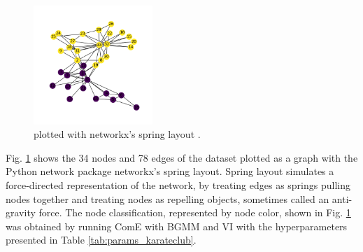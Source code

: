 \documentclass[conference]{IEEEtran}
\begin{document}
\begin{figure}[htbp]
    \centering
    \includegraphics[width=0.4\textwidth]{images/karateclub/spring.png}
    \caption{ plotted with networkx's spring layout \cite{KarateClubDS, networkx}.}
    \label{fig:karateclub_spring}
\end{figure}

Fig. \ref{fig:karateclub_spring} shows the 34 nodes and 78 edges of the  dataset plotted as a graph with the Python network package networkx's spring layout.\cite{networkx} Spring layout simulates a force-directed representation of the network, by treating edges as springs pulling nodes together and treating nodes as repelling objects, sometimes called an anti-gravity force.\cite{networkx} The node classification, represented by node color, shown in Fig. \ref{fig:karateclub_spring} was obtained by running ComE with BGMM and VI with the hyperparameters presented in Table \ref{tab:params_karateclub}.
\end{document}
